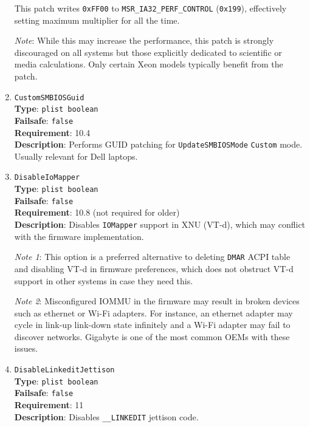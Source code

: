 \documentclass[]{article}
\begin{document}
\begin{enumerate}
  This patch writes \texttt{0xFF00} to \texttt{MSR\_IA32\_PERF\_CONTROL} (\texttt{0x199}),
  effectively setting maximum multiplier for all the time.

  \emph{Note}: While this may increase the performance, this patch is strongly discouraged
  on all systems but those explicitly dedicated to scientific or media calculations.
  Only certain Xeon models typically benefit from the patch.

\item
  \texttt{CustomSMBIOSGuid}\\
  \textbf{Type}: \texttt{plist\ boolean}\\
  \textbf{Failsafe}: \texttt{false}\\
  \textbf{Requirement}: 10.4\\
  \textbf{Description}: Performs GUID patching for \texttt{UpdateSMBIOSMode}
  \texttt{Custom} mode. Usually relevant for Dell laptops.

\item
  \texttt{DisableIoMapper}\\
  \textbf{Type}: \texttt{plist\ boolean}\\
  \textbf{Failsafe}: \texttt{false}\\
  \textbf{Requirement}: 10.8 (not required for older)\\
  \textbf{Description}: Disables \texttt{IOMapper} support in XNU (VT-d),
  which may conflict with the firmware implementation.

  \emph{Note 1}: This option is a preferred alternative to deleting \texttt{DMAR}
  ACPI table and disabling VT-d in firmware preferences, which does not obstruct
  VT-d support in other systems in case they need this.

  \emph{Note 2}: Misconfigured IOMMU in the firmware may result in broken devices 
  such as ethernet or Wi-Fi adapters. For instance, an ethernet adapter may cycle in link-up 
  link-down state infinitely and a Wi-Fi adapter may fail to discover networks. 
  Gigabyte is one of the most common OEMs with these issues.

\item
  \texttt{DisableLinkeditJettison}\\
  \textbf{Type}: \texttt{plist\ boolean}\\
  \textbf{Failsafe}: \texttt{false}\\
  \textbf{Requirement}: 11\\
  \textbf{Description}: Disables \texttt{\_\_LINKEDIT} jettison code.


\end{enumerate}
\end{document}
